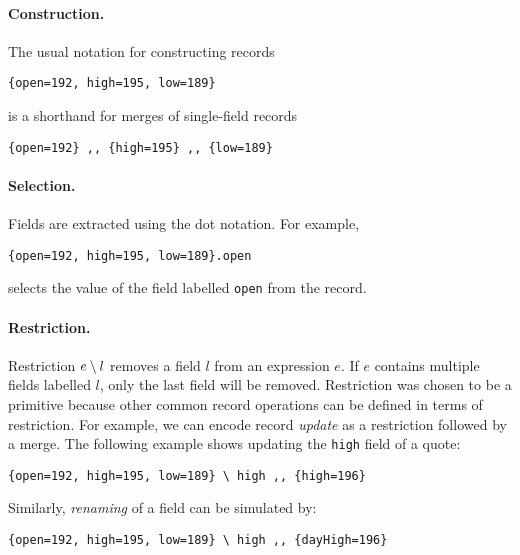 \paragraph{Construction.} The usual notation for constructing records
\begin{lstlisting}
{open=192, high=195, low=189}
\end{lstlisting}
is a shorthand for merges of single-field records
\begin{lstlisting}
{open=192} ,, {high=195} ,, {low=189}
\end{lstlisting}

\paragraph{Selection.}
Fields are extracted using the dot notation. For example,
\begin{lstlisting}
{open=192, high=195, low=189}.open
\end{lstlisting}
selects the value of the field labelled \lstinline{open} from the record.

\paragraph{Restriction.}
Restriction $e \setminus l$ removes a field $l$ from an expression $e$. If $e$
contains multiple fields labelled $l$, only the last field will be removed.
Restriction was chosen to be a primitive because other common
record operations can be defined in terms of restriction. For example, we can encode record
\emph{update} as a restriction followed by a merge. The following example
shows updating the \lstinline{high} field of a quote:
\begin{lstlisting}
{open=192, high=195, low=189} \ high ,, {high=196}
\end{lstlisting}
Similarly, \emph{renaming} of a field can be simulated by:
\begin{lstlisting}
{open=192, high=195, low=189} \ high ,, {dayHigh=196}
\end{lstlisting}

\begin{comment}
Refinement of fields is also possible, in the sense
that the type of a new value can be a subtype of that of the old
one.~\footnote{The subtyping restriction is not required for the \name to be
  coherent and it leaves option open for language designers.}
\bruno{Are we going to show an example of this?}
\end{comment}

